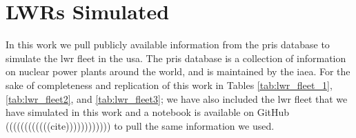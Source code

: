 \chapter{LWRs Simulated}
\label{app:lwrs}

In this work we pull publicly available information from the \gls{pris} database to simulate the \gls{lwr} fleet in the \gls{usa}. The \gls{pris} database is a collection of information on nuclear power plants around the world, and is maintained by the \gls{iaea}. For the sake of completeness and replication of this work in Tables \ref{tab:lwr_fleet_1}, \ref{tab:lwr_fleet2}, and \ref{tab:lwr_fleet3}; we have also included the \gls{lwr} fleet that we have simulated in this work and a notebook is available on GitHub ((((((((((((cite)))))))))))) to pull the same information we used.


